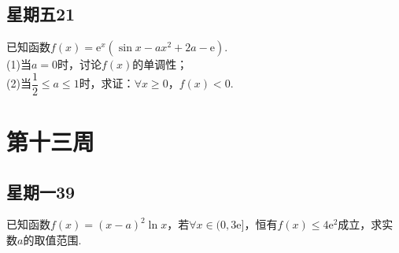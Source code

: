 \documentclass[UTF8,a4paper,11 pt]{ctexart}%
\newcommand\eu{\mathrm{e}}%
\begin{document}
	\subsection{星期五21}\noindent
	已知函数$ f(x)=\eu^x(\sin x-ax^2+2a-\eu) $.
	\\(1)当$ a=0 $时，讨论$ f(x) $的单调性；
	\\(2)当$ \dfrac{1}{2}\le a\le 1 $时，求证：$ \forall x\ge0 $，$ f(x)<0 $.
	\clearpage\section{第十三周}
	\subsection{星期一39}\noindent
	已知函数$ f(x)=(x-a)^2\ln x $，若$ \forall x\in(0,3\eu] $，恒有$ f(x)\le4\eu^2 $成立，求实数$ a $的取值范围.
	\\\,\\\,\\\,\\\,\\\,\\\,\\\,\\\,\\\,
\end{document}
